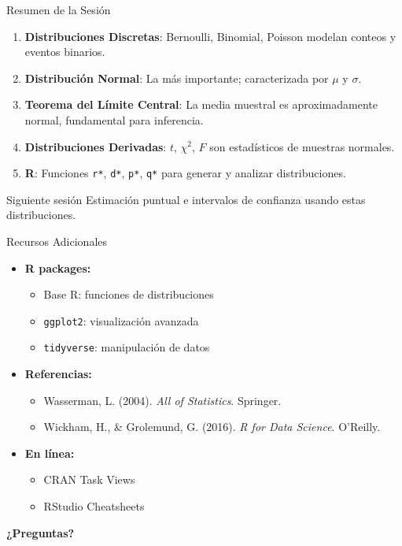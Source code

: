 \documentclass[aspectratio=169,11pt]{beamer}
\begin{document}
\begin{frame}{Resumen de la Sesión}
\begin{enumerate}
  \item \textbf{Distribuciones Discretas}: Bernoulli, Binomial, Poisson modelan conteos y eventos binarios.
  \pause
  \item \textbf{Distribución Normal}: La más importante; caracterizada por $\mu$ y $\sigma$.
  \pause
  \item \textbf{Teorema del Límite Central}: La media muestral es aproximadamente normal, fundamental para inferencia.
  \pause
  \item \textbf{Distribuciones Derivadas}: $t$, $\chi^2$, $F$ son estadísticos de muestras normales.
  \pause
  \item \textbf{R}: Funciones \texttt{r*}, \texttt{d*}, \texttt{p*}, \texttt{q*} para generar y analizar distribuciones.
\end{enumerate}

\pause
\vspace{0.4cm}
\begin{block}{Siguiente sesión}
Estimación puntual e intervalos de confianza usando estas distribuciones.
\end{block}
\end{frame}

\begin{frame}{Recursos Adicionales}
\begin{itemize}
  \item \textbf{R packages:}
  \begin{itemize}
    \item Base R: funciones de distribuciones
    \item \texttt{ggplot2}: visualización avanzada
    \item \texttt{tidyverse}: manipulación de datos
  \end{itemize}
  \pause
  \item \textbf{Referencias:}
  \begin{itemize}
    \item Wasserman, L. (2004). \textit{All of Statistics}. Springer.
    \item Wickham, H., \& Grolemund, G. (2016). \textit{R for Data Science}. O'Reilly.
  \end{itemize}
  \pause
  \item \textbf{En línea:}
  \begin{itemize}
    \item CRAN Task Views
    \item RStudio Cheatsheets
  \end{itemize}
\end{itemize}

\pause
\vspace{0.4cm}
\centering
\Large \textbf{¿Preguntas?}
\end{frame}
\end{document}
